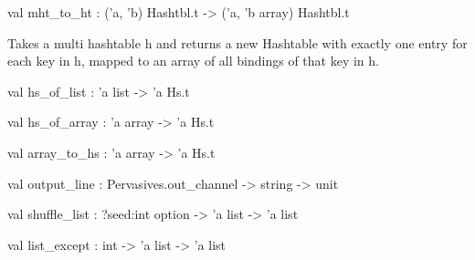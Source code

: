 \documentclass[11pt]{article}
\begin{document}
\label{val:Util.mht-underscoreto-underscoreht}\begin{ocamldoccode}
val mht_to_ht : ('a, 'b) Hashtbl.t -> ('a, 'b array) Hashtbl.t
\end{ocamldoccode}
\begin{ocamldocdescription}
Takes a multi hashtable h and returns a new Hashtable with exactly one entry
    for each key in h, mapped to an array of all bindings of that key in h.


\end{ocamldocdescription}




\label{val:Util.hs-underscoreof-underscorelist}\begin{ocamldoccode}
val hs_of_list : 'a list -> 'a Hs.t
\end{ocamldoccode}




\label{val:Util.hs-underscoreof-underscorearray}\begin{ocamldoccode}
val hs_of_array : 'a array -> 'a Hs.t
\end{ocamldoccode}




\label{val:Util.array-underscoreto-underscorehs}\begin{ocamldoccode}
val array_to_hs : 'a array -> 'a Hs.t
\end{ocamldoccode}




\label{val:Util.output-underscoreline}\begin{ocamldoccode}
val output_line : Pervasives.out_channel -> string -> unit
\end{ocamldoccode}




\label{val:Util.shuffle-underscorelist}\begin{ocamldoccode}
val shuffle_list : ?seed:int option -> 'a list -> 'a list
\end{ocamldoccode}




\label{val:Util.list-underscoreexcept}\begin{ocamldoccode}
val list_except : int -> 'a list -> 'a list
\end{ocamldoccode}
\end{document}
